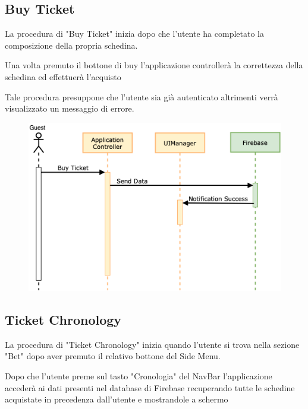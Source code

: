 \documentclass[numbers=noenddot, 12pt, a4paper, oneside]{scrbook}
\begin{document}
\newpage

\subsection*{Buy Ticket}

La procedura di "Buy Ticket" inizia dopo che l'utente ha completato la composizione della propria schedina.

Una volta premuto il bottone di buy l'applicazione controllerà la correttezza della schedina ed effettuerà l'acquisto 

Tale procedura presuppone che l'utente sia già autenticato altrimenti verrà visualizzato un messaggio di errore.

\begin{figure}[H]
	\centering
	\includegraphics[width=1\textwidth]{images/Sequence/BuyTicket}
\end{figure}

\newpage

\subsection*{Ticket Chronology}
La procedura di "Ticket Chronology" inizia quando l'utente si trova nella sezione "Bet" dopo aver premuto il relativo bottone del Side Menu.

Dopo che l'utente preme sul tasto "Cronologia" del NavBar l'applicazione accederà ai dati presenti nel database di Firebase recuperando tutte le schedine acquistate in precedenza dall'utente e mostrandole a schermo
\end{document}
